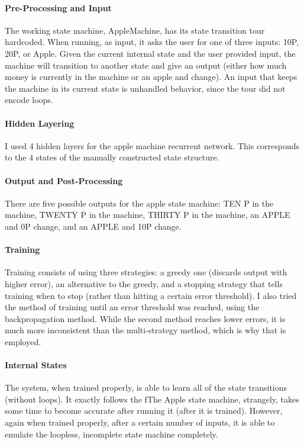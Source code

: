 \documentclass[12pt]{article}
\begin{document}
\paragraph*{Pre-Processing and Input}
The working state machine, AppleMachine, has its state transition tour hardcoded. When running, as input, it asks the user for one of three inputs: 10P, 20P, or Apple. Given the current internal state and the user provided input, the machine will transition to another state and give an output (either how much money is currently in the machine or an apple and change). An input that keeps the machine in its current state is unhandled behavior, since the tour did not encode loops.


\paragraph*{Hidden Layering}
I used 4 hidden layers for the apple machine recurrent network. This corresponds to the 4 states of the manually constructed state structure.


\paragraph*{Output and Post-Processing}
There are five possible outputs for the apple state machine: TEN P in the machine, TWENTY P in the machine, THIRTY P in the machine, an APPLE and 0P change, and an APPLE and 10P change.

\paragraph*{Training}
Training consists of using three strategies: a greedy one (discards output with higher error), an alternative to the greedy, and a stopping strategy that tells training when to stop (rather than hitting a certain error threshold). I also tried the method of training until an error threshold was reached, using the backpropagation method. While the second method reaches lower errors, it is much more inconsistent than the multi-strategy method, which is why that is employed.

\paragraph*{Internal States}
The system, when trained properly, is able to learn all of the state transitions (without loops). It exactly follows the fThe Apple state machine, strangely, takes some time to become accurate after running it (after it is trained). However, again when trained properly, after a certain number of inputs, it is able to emulate the loopless, incomplete state machine completely.
\end{document}
